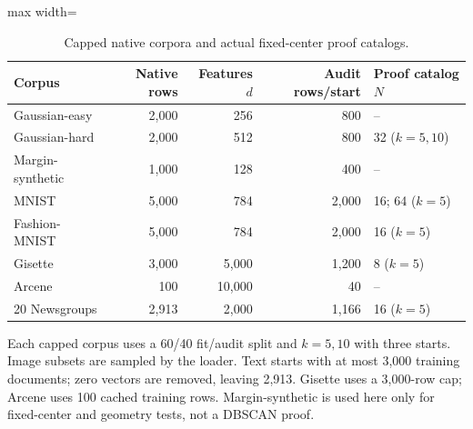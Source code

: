 \begin{table}[tp]
\caption{Capped native corpora and actual fixed-center proof catalogs.}\label{tab:datasets-a}
\centering\small
\begin{adjustbox}{max width=\textwidth}
\begin{tabular}{@{}lrrrl@{}}
\toprule
Corpus & Native rows & Features $d$ & Audit rows/start & Proof catalog $N$ \\
\midrule
Gaussian-easy & 2,000 & 256 & 800 & -- \\
Gaussian-hard & 2,000 & 512 & 800 & 32 ($k=5,10$) \\
Margin-synthetic & 1,000 & 128 & 400 & -- \\
MNIST & 5,000 & 784 & 2,000 & 16; 64 ($k=5$) \\
Fashion-MNIST & 5,000 & 784 & 2,000 & 16 ($k=5$) \\
Gisette & 3,000 & 5,000 & 1,200 & 8 ($k=5$) \\
Arcene & 100 & 10,000 & 40 & -- \\
20 Newsgroups & 2,913 & 2,000 & 1,166 & 16 ($k=5$) \\
\bottomrule
\end{tabular}
\end{adjustbox}
\par\vspace{3pt}\begin{minipage}{0.98\textwidth}\footnotesize Each capped corpus uses a 60/40 fit/audit split and $k=5,10$ with three starts. Image subsets are sampled by the loader. Text starts with at most 3,000 training documents; zero vectors are removed, leaving 2,913. Gisette uses a 3,000-row cap; Arcene uses 100 cached training rows. Margin-synthetic is used here only for fixed-center and geometry tests, not a DBSCAN proof.\end{minipage}
\end{table}
